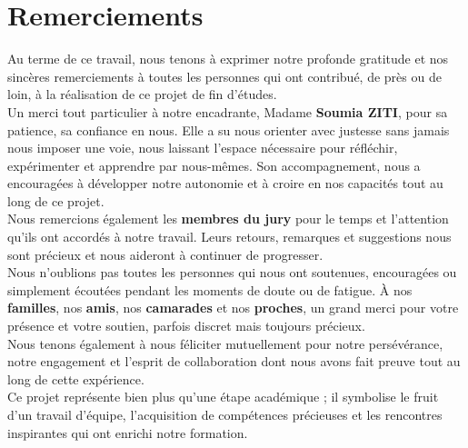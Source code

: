 \chapter*{Remerciements}



Au terme de ce travail, nous tenons à exprimer notre profonde gratitude et nos sincères remerciements à toutes les personnes qui ont contribué, de près ou de loin, à la réalisation de ce projet de fin d'études.\\

Un merci tout particulier à notre encadrante, Madame \textbf{Soumia ZITI}, pour sa patience, sa confiance en nous. Elle a su nous orienter avec justesse sans jamais nous imposer une voie, nous laissant l’espace nécessaire pour réfléchir, expérimenter et apprendre par nous-mêmes. Son accompagnement, nous a encouragées à développer notre autonomie et à croire en nos capacités tout au long de ce projet.\\

Nous remercions également les \textbf{membres du jury} pour le temps et l’attention qu’ils ont accordés à notre travail. Leurs retours, remarques et suggestions nous sont précieux et nous aideront à continuer de progresser.\\

Nous n’oublions pas toutes les personnes qui nous ont soutenues, encouragées ou simplement écoutées pendant les moments de doute ou de fatigue. À nos \textbf{familles}, nos \textbf{amis}, nos \textbf{camarades} et nos \textbf{proches}, un grand merci pour votre présence et votre soutien, parfois discret mais toujours précieux.\\

Nous tenons également à nous féliciter mutuellement pour notre persévérance, notre engagement et l’esprit de collaboration dont nous avons fait preuve tout au long de cette expérience.\\

Ce projet représente bien plus qu'une étape académique ; il symbolise le fruit d'un travail d'équipe, l'acquisition de compétences précieuses et les rencontres inspirantes qui ont enrichi notre formation.\\



